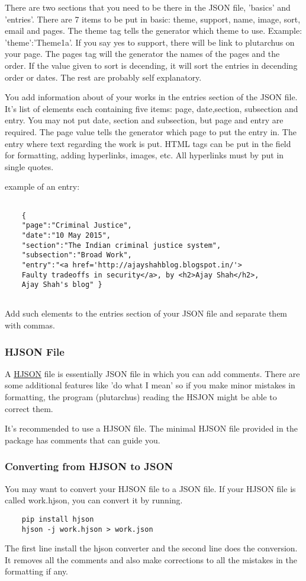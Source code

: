 \documentclass[12pt]{article}
\begin{document}
    There are two sections that you need to be there in the JSON file, 'basics' and 'entries'. There are 7 items to be put in basic: theme, support, name, image, sort, email and pages. The theme tag tells the generator which theme to use. Example: 'theme':'Theme1a'. If you say yes to support, there will be link to plutarchus on your page. The pages tag will the generator the names of the pages and the order. If the value given to sort is decending, it will sort the entries in decending order or dates. The rest are probably self explanatory. 

    You add information about of your works in the entries section of the JSON file. It's list of elements each containing five items: page, date,section, subsection and entry.  You may not put date, section and subsection, but page and entry are required. The page value tells the generator which page to put the entry in. The entry where text regarding the work is put. HTML tags can be put in the field for formatting, adding hyperlinks, images, etc. All hyperlinks must by put in single quotes. 

    example of an entry: 
    \begin{verbatim}

    {
    "page":"Criminal Justice",
    "date":"10 May 2015",
    "section":"The Indian criminal justice system",
    "subsection":"Broad Work",
    "entry":"<a href='http://ajayshahblog.blogspot.in/'>
    Faulty tradeoffs in security</a>, by <h2>Ajay Shah</h2>,
    Ajay Shah's blog" }
    
    \end{verbatim}

    Add such elements to the entries section of your JSON file and separate them with commas. 

    \subsubsection{HJSON File}

    A \href{https://hjson.org/}{HJSON} file is essentially JSON file in which you can add comments. There are some additional features like 'do what I mean' so if you make minor mistakes in formatting, the program (plutarchus) reading the HSJON might be able to correct them.
    
    It's recommended to use a HJSON file. The minimal HJSON file provided in the package has comments that can guide you. 

    \subsubsection{Converting from HJSON to JSON}
    You may want to convert your HJSON file to a JSON file. If your HJSON file is called work.hjson, you can convert it by running. 
    \begin{verbatim}
    pip install hjson
    hjson -j work.hjson > work.json
    \end{verbatim}
    The first line install the hjson converter and the second line does the conversion.
    It removes all the comments and also make corrections to all the mistakes in the formatting if any.
\end{document}
